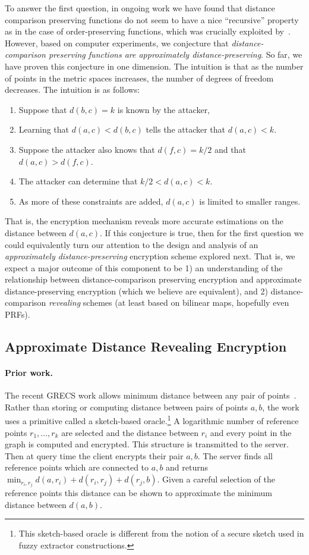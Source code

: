 To answer the first question, in ongoing work we have found that
distance comparison preserving functions do not seem to have a nice
``recursive'' property as in the case of order-preserving functions,
which was crucially exploited by~\cite{EC:BCLO09}.  However, based on
computer experiments, we conjecture that \emph{distance-comparison
preserving functions are approximately distance-preserving}.    So far,
we have proven this conjecture in one dimension.  The intuition is that
as the number of points in the metric spaces increases, the number of degrees of freedom decreases.  The intuition is as follows:
\begin{enumerate}\setlength\itemsep{0em}
\item Suppose that $d(b,c) = k$ is known by the attacker, 
\item Learning that $d(a,c) < d(b,c)$ tells the attacker that $d(a,c)<k$.  
\item Suppose the attacker also knows that $d(f, c) = k/2$ and that $d(a,c) > d(f,c)$.  
\item The attacker can determine that $k/2< d(a,c) <k$.  
\item As more of these constraints are added, $d(a,c)$ is limited to smaller ranges.
\end{enumerate}
That is, the encryption mechanism reveals more accurate estimations on  the distance between $d(a,c)$.
If this conjecture is true, then for the first question we could equivalently turn our attention to the design and analysis of  an \emph{approximately distance-preserving} encryption scheme explored next.  That is, we expect a major outcome of this component to be 1) an understanding of the relationship between distance-comparison preserving encryption and approximate distance-preserving encryption (which we believe are equivalent), and 2) distance-comparison \emph{revealing} schemes (at least based on bilinear maps, hopefully even PRFs).

\subsection{Approximate Distance Revealing Encryption}
\label{sec:adre}
\paragraph{Prior work.}
The recent GRECS work allows minimum distance between any pair of
points~\cite{CCS:MKNK15}.  Rather than storing or computing distance
between pairs of points $a,b$, the work uses a primitive called a
sketch-based oracle.\footnote{This sketch-based oracle is different from
the notion of a secure sketch used in fuzzy extractor constructions.}  A logarithmic number of reference points $r_1,..., r_k$ are selected and the distance between $r_i$ and every point in the graph is computed and encrypted.  This structure is transmitted to the server.  Then at query time the client encrypts their pair $a,b$.  The server finds all reference points which are connected to $a,b$ and returns $\min_{r_i, r_j} d(a,r_i) + d(r_i, r_j) + d(r_j, b)$.  Given a careful selection of the reference points this distance can be shown to approximate the minimum distance between $d(a,b)$.

